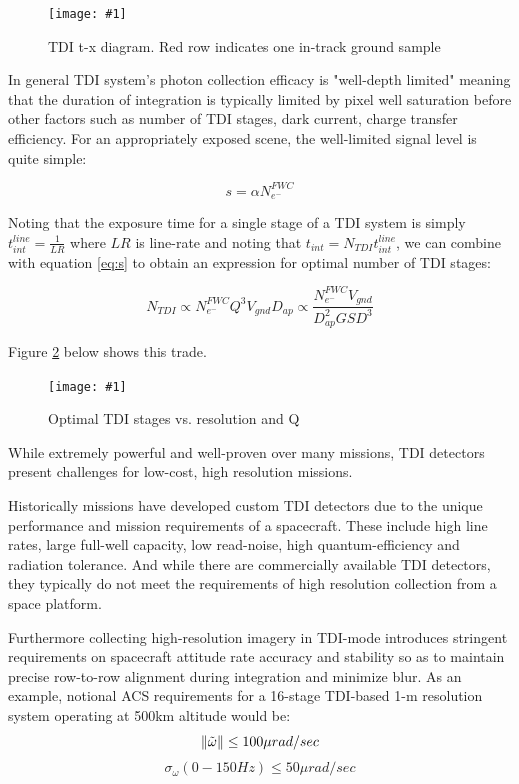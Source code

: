 \documentclass[10pt,journal]{IEEEtran}  %
\newcommand{\includefigure}[3]
{
  \begin{figure}[h!]
  \centering
  \texttt{[image: \#1]}
  \caption[]{#3}
  \label{#2}
  \end{figure}
}
\DeclarePairedDelimiter{\norm}{\lVert}{\rVert}
\begin{document}
\includefigure{figures/tdi.pgf}{fig:tdi}{TDI t-x diagram.  Red row indicates one in-track ground sample}

In general TDI system's photon collection efficacy is "well-depth limited" meaning that the duration of integration is typically limited by pixel well saturation before other factors such as number of TDI stages, dark current, charge transfer efficiency.  For an appropriately exposed scene, the well-limited signal level is quite simple:

\begin{equation}
s = \alpha N_{e^-}^{FWC}
\label{eq:well_limited}
\end{equation}

Noting that the exposure time for a single stage of a TDI system is simply $t_{int}^{line} = \frac{1}{LR}$ where $LR$ is line-rate and noting that $t_{int} = N_{TDI}t_{int}^{line}$, we can combine with equation \ref{eq:s} to obtain an expression for optimal number of TDI stages:

\begin{equation}
N_{TDI} \propto N_{e^-}^{FWC} Q^3 V_{gnd}D_{ap} \propto \frac{N_{e^-}^{FWC}V_{gnd}}{D_{ap}^2 GSD^3}
\label{eq:n_tdi}
\end{equation}

Figure \ref{fig:n_tdi} below shows this trade.

\includefigure{figures/N_tdi.pgf}{fig:n_tdi}{Optimal TDI stages vs. resolution and Q}

While extremely powerful and well-proven over many missions, TDI detectors present challenges for low-cost, high resolution missions.

Historically missions have developed custom TDI detectors due to the unique performance and mission requirements of a spacecraft\cite{jerram}.  These include high line rates, large full-well capacity, low read-noise, high quantum-efficiency and radiation tolerance.  And while there are commercially available TDI detectors, they typically do not meet the requirements of high resolution collection from a space platform.

Furthermore collecting high-resolution imagery in TDI-mode introduces stringent requirements on spacecraft attitude rate accuracy and stability so as to maintain precise row-to-row alignment during integration and minimize blur. As an example, notional ACS requirements for a 16-stage TDI-based 1-m resolution system operating at 500km altitude would be\cite{pittelkau}:
$$\norm{\tilde{\omega}} \leq 100 \mu rad / sec$$
$$\sigma_{\omega}(0-150Hz) \leq 50 \mu rad/sec$$
\end{document}
